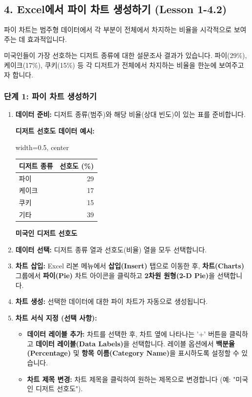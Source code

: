 \documentclass[11pt,a4paper]{book}
\providecommand{\captionof}[2]{\textbf{#2}}
\theoremstyle{definition}
\begin{document}
\subsection{4. Excel에서 파이 차트 생성하기 (Lesson 1-4.2)}

파이 차트는 범주형 데이터에서 각 부분이 전체에서 차지하는 비율을 시각적으로 보여주는 데 효과적입니다.

\begin{tcolorbox}[title={\textbf{시나리오: 미국인 디저트 선호도 분석},colback=lightblue,colframe=darkblue}]
미국인들이 가장 선호하는 디저트 종류에 대한 설문조사 결과가 있습니다. 파이(29\%), 케이크(17\%), 쿠키(15\%) 등 각 디저트가 전체에서 차지하는 비율을 한눈에 보여주고자 합니다.
\end{tcolorbox}

\subsubsection*{단계 1: 파이 차트 생성하기}

\begin{enumerate}
    \item \textbf{데이터 준비:} 디저트 종류(범주)와 해당 비율(상대 빈도)이 있는 표를 준비합니다.
    \begin{examplebox}
    \textbf{디저트 선호도 데이터 예시:}
    \begin{adjustbox}{width=0.5\textwidth, center}
    \begin{tabular}{lr}
    \toprule
    \textbf{디저트 종류} & \textbf{선호도 (\%)} \\
    \midrule
    파이 & 29 \\
    케이크 & 17 \\
    쿠키 & 15 \\
    기타 & 39 \\ %
    \bottomrule
    \end{tabular}
    \end{adjustbox}
    \captionof{table}{미국인 디저트 선호도}
    \end{examplebox}
    \item \textbf{데이터 선택:} 디저트 종류 열과 선호도(비율) 열을 모두 선택합니다.
    \item \textbf{차트 삽입:} Excel 리본 메뉴에서 \textbf{삽입(Insert)} 탭으로 이동한 후, \textbf{차트(Charts)} 그룹에서 \textbf{파이(Pie)} 차트 아이콘을 클릭하고 \textbf{2차원 원형(2-D Pie)}을 선택합니다.
    \item \textbf{차트 생성:} 선택한 데이터에 대한 파이 차트가 자동으로 생성됩니다.
    \item \textbf{차트 서식 지정 (선택 사항):}
    \begin{itemize}
        \item \textbf{데이터 레이블 추가:} 차트를 선택한 후, 차트 옆에 나타나는 '+' 버튼을 클릭하고 \textbf{데이터 레이블(Data Labels)}을 선택합니다. 레이블 옵션에서 \textbf{백분율(Percentage)} 및 \textbf{항목 이름(Category Name)}을 표시하도록 설정할 수 있습니다.
        \item \textbf{차트 제목 변경:} 차트 제목을 클릭하여 원하는 제목으로 변경합니다 (예: "미국인 디저트 선호도").
    \end{itemize}
\end{enumerate}
\end{document}
